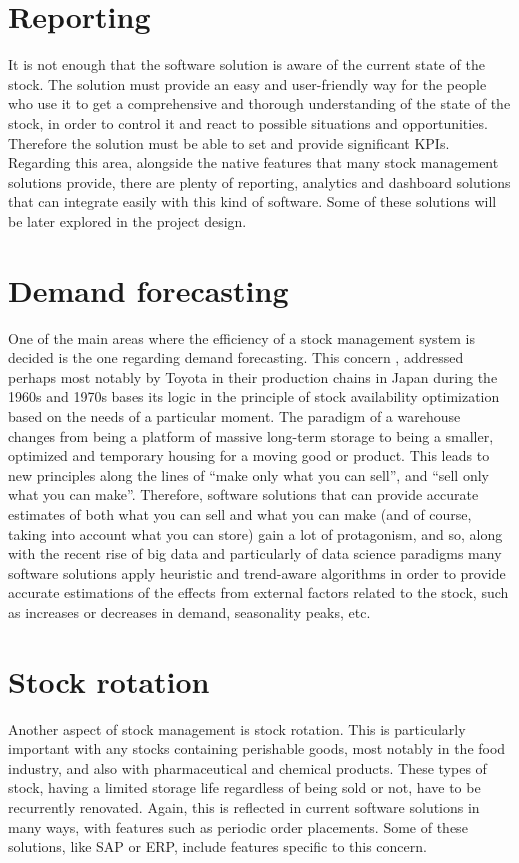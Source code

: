 \section{Reporting}
It is not enough that the software solution is aware of the current state of the stock. The solution must provide an easy and user-friendly way for the people who use it to get a comprehensive and thorough understanding of the state of the stock, in order to control it and react to possible situations and opportunities. Therefore the solution must be able to set and provide significant KPIs.
Regarding this area, alongside the native features that many stock management solutions provide, there are plenty of reporting, analytics and dashboard solutions that can integrate easily with this kind of software. Some of these solutions will be later explored in the project design.
\section{Demand forecasting}
One of the main areas where the efficiency of a stock management system is decided is the one regarding demand forecasting. This concern \cite{7}, addressed perhaps most notably by Toyota in their production chains in Japan during the 1960s and 1970s bases its logic in the principle of stock availability optimization based on the needs of a particular moment.
The paradigm of a warehouse changes from being a platform of massive long-term storage to being a smaller, optimized and temporary housing for a moving good or product. This leads to new principles along the lines of “make only what you can sell”, and “sell only what you can make”. Therefore, software solutions that can provide accurate estimates of both what you can sell and what you can make (and of course, taking into account what you can store) gain a lot of protagonism, and so, along with the recent rise of big data and particularly of data science paradigms many software solutions apply heuristic and trend-aware algorithms in order to provide accurate estimations of the effects from external factors related to the stock, such as increases or decreases in demand, seasonality peaks, etc.
\section{Stock rotation}
Another aspect of stock management is stock rotation. This is particularly important with any stocks containing perishable goods, most notably in the food industry, and also with pharmaceutical and chemical products. These types of stock, having a limited storage life regardless of being sold or not, have to be recurrently renovated. Again, this is reflected in current software solutions in many ways, with features such as periodic order placements. Some of these solutions, like SAP or ERP, include features specific to this concern.
